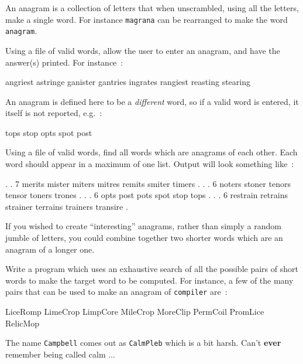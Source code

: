 
An anagram is a collection of letters that
when unscrambled, using all the letters, make
a single word. For instance \verb^magrana^ can
be rearranged to make the word \verb^anagram^.

\begin{exercise}
Using a file of valid words, allow the user
to enter an anagram, and have the answer(s)
printed. For instance~:
\begin{terminaloutput}
angriest
astringe
ganister
gantries
ingrates
rangiest
reasting
stearing
\end{terminaloutput}

An anagram is defined here to be a {\em different} word, so if a valid word is 
entered, it itself is not reported, e.g.~:
\begin{terminaloutput}
tops
stop
opts
spot
post
\end{terminaloutput}

\end{exercise}

\begin{exercise}
Using a file of valid words, find all
words which are anagrams of each other.
Each word should appear in a maximum of one list.
Output will look something like~:
\begin{terminaloutput}
.
.
7 merits mister miters mitres remits smiter timers
.
.
.
6 noters stoner tenors tensor toners trones
.
.
.
6 opts post pots spot stop tops
.
.
.
6 restrain retrains strainer terrains trainers transire
.
\end{terminaloutput}
\end{exercise}

If you wished to create ``interesting'' anagrams, rather than simply
a random jumble of letters, you could combine together two
shorter words which are an anagram of a longer one.

\begin{exercise}
Write a program which uses an exhaustive
search of all the possible pairs of short words to make the target word
to be computed.
For instance, a few of the many pairs that
can be used to make an anagram of \verb^compiler^ are~:
\begin{terminaloutput}
LiceRomp
LimeCrop
LimpCore
MileCrop
MoreClip
PermCoil
PromLice
RelicMop
\end{terminaloutput}
\end{exercise}

The name \verb^Campbell^ comes out as \verb^CalmPleb^ which is a
bit harsh. Can't {\bf ever} remember being called calm ... 
